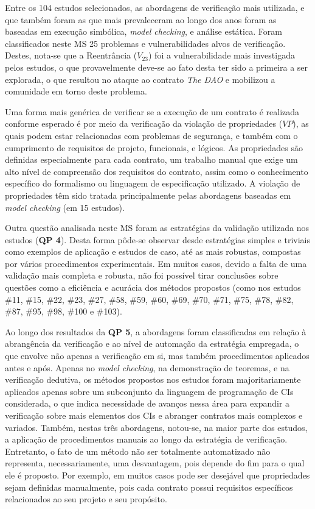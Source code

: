 Entre os 104 estudos selecionados, as abordagens de verificação mais utilizada, e que também foram as que mais prevaleceram ao longo dos anos foram as baseadas em execução simbólica, \textit{model checking}, e análise estática. Foram classificados neste MS 25 problemas e vulnerabilidades alvos de verificação. Destes, nota-se que a Reentrância ($V_{23}$) foi a vulnerabilidade mais investigada pelos estudos, o que provavelmente deve-se ao fato desta ter sido a primeira a ser explorada, o que resultou no ataque ao contrato \textit{The DAO} e mobilizou a comunidade em torno deste problema. 

Uma forma mais genérica de verificar se a execução de um contrato é realizada conforme esperado é por meio da verificação da violação de propriedades ($VP$), as quais podem estar relacionadas com problemas de segurança, e também com o cumprimento de requisitos de projeto, funcionais, e lógicos. As propriedades são definidas especialmente para cada contrato, um trabalho manual que exige um alto nível de compreensão dos requisitos do contrato, assim como o conhecimento específico do formalismo ou linguagem de especificação utilizado. A violação de propriedades têm sido tratada principalmente pelas abordagens baseadas em \textit{model checking} (em 15 estudos).

Outra questão analisada neste MS foram as estratégias da validação utilizada nos estudos (\textbf{QP 4}). Desta forma pôde-se observar desde estratégias simples e triviais como exemplos de aplicação e estudos de caso, até as mais robustas, compostas por vários procedimentos experimentais. Em muitos casos, devido a falta de uma validação mais completa e robusta, não foi possível tirar conclusões sobre questões como a eficiência e acurácia dos métodos propostos (como nos estudos \#11, \#15, \#22, \#23, \#27, \#58, \#59, \#60, \#69, \#70, \#71, \#75, \#78, \#82, \#87, \#95, \#98, \#100 e \#103).  

Ao longo dos resultados da \textbf{QP 5}, a abordagens foram classificadas em relação à abrangência da verificação e ao nível de automação da estratégia empregada, o que envolve não apenas a verificação em si, mas também procedimentos aplicados antes e após. Apenas no \textit{model checking}, na demonstração de teoremas, e na verificação dedutiva, os métodos propostos nos estudos foram majoritariamente aplicados apenas sobre um subconjunto da linguagem de programação de CIs considerada, o que indica necessidade de avanços nessa área para expandir a verificação sobre mais elementos dos CIs e abranger contratos mais complexos e variados. Também, nestas três abordagens, notou-se, na maior parte dos estudos, a aplicação de procedimentos manuais ao longo da estratégia de verificação. Entretanto, o fato de um método não ser totalmente automatizado não representa, necessariamente, uma desvantagem, pois depende do fim para o qual ele é proposto. Por exemplo, em muitos casos pode ser desejável que propriedades sejam definidas manualmente, pois cada contrato possui requisitos específicos relacionados ao seu projeto e seu propósito.

